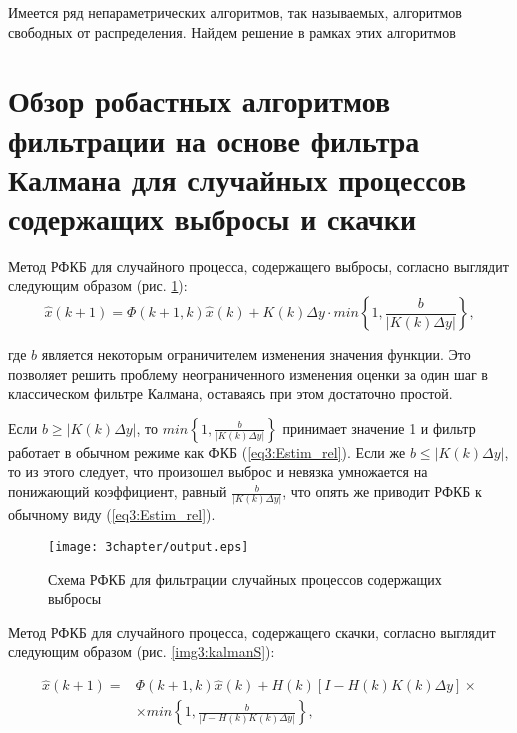 Имеется ряд непараметрических алгоритмов, так называемых, алгоритмов свободных от распределения. Найдем решение в рамках этих алгоритмов


\section{Обзор робастных алгоритмов фильтрации на основе фильтра Калмана для случайных процессов содержащих выбросы и скачки} \label{sect3_grfk}

Метод РФКБ для случайного процесса, содержащего выбросы, согласно \cite{RobustFilter} выглядит следующим образом (рис. \ref{img3:kalmanV}):
\begin{equation}\label{eq3:skachok}
\hat{x}(k+1)=\Phi(k+1,k)\hat{x}(k)+K(k)\Delta y\cdot min\left\{1,\frac{b}{|K(k)\Delta y|}\right\},
\end{equation}

\noindent где $b$ является некоторым ограничителем изменения значения функции. 
Это позволяет решить проблему неограниченного изменения оценки за один шаг в классическом фильтре Калмана, оставаясь при этом достаточно простой.

Если $b\geq |K(k) \Delta y |$, то $min\left\{1,\frac{b}{|K(k)\Delta y|}\right\}$ принимает значение 1 и фильтр работает в обычном режиме как ФКБ (\ref{eq3:Estim_rel}). Если же $b\leq |K(k) \Delta y |$, то из этого следует, что произошел выброс и невязка умножается на понижающий коэффициент, равный $\frac{b}{|K(k)\Delta y|}$, что опять же приводит РФКБ к обычному виду (\ref{eq3:Estim_rel}).

\begin{figure} [h]
  \center
\texttt{[image: 3chapter/output.eps]}
  \caption{Схема РФКБ для фильтрации случайных процессов содержащих выбросы}
  \label{img3:kalmanV}
\end{figure}

Метод РФКБ для случайного процесса, содержащего скачки, согласно \cite{RobustFilter} выглядит следующим образом (рис. \ref{img3:kalmanS}):

\begin{equation}\label{eq3:vibros}
\begin{split}
\hat{x}(k+1)=&\Phi(k+1,k)\hat{x}(k)+H(k)[I-H(k)K(k)\Delta y]\times \\
&\times min\left\{1,\frac{b}{|I-H(k)K(k)\Delta y|}\right\},
\end{split}
\end{equation}


